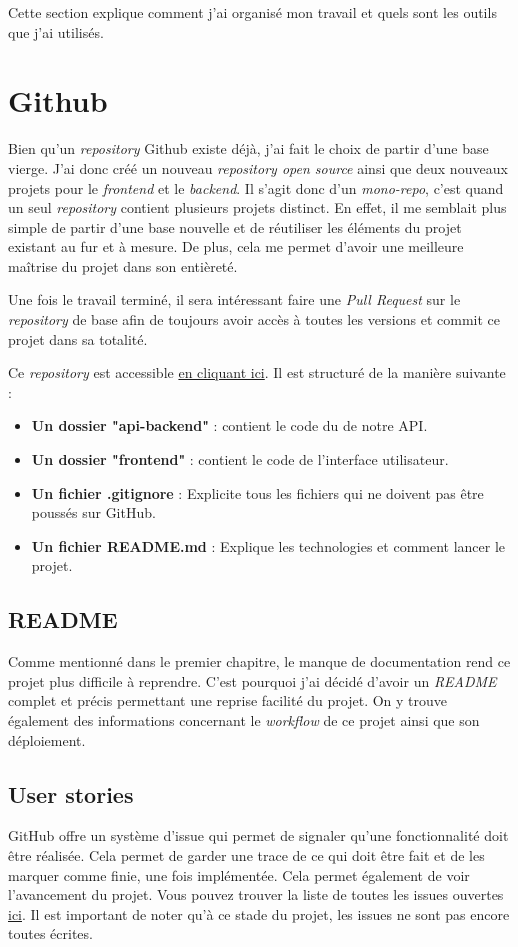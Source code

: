 Cette section explique comment j'ai organisé mon travail et quels sont les outils que j'ai utilisés.

\section{Github}
Bien qu'un \emph{repository} Github existe déjà, j'ai fait le choix de partir d'une base vierge. J'ai donc créé un nouveau \emph{repository open source} ainsi que deux nouveaux projets pour le \emph{frontend} et le \emph{backend}. Il s'agit donc d'un \emph{mono-repo}, c'est quand un seul \emph{repository} contient plusieurs projets distinct. En effet, il me semblait plus simple de partir d'une base nouvelle et de réutiliser les éléments du projet existant au fur et à mesure. De plus, cela me permet d'avoir une meilleure maîtrise du projet dans son entièreté.

Une fois le travail terminé, il sera intéressant faire une \emph{Pull Request} sur le \emph{repository} de base afin de toujours avoir accès à toutes les versions et commit ce projet dans sa totalité.

Ce \emph{repository} est accessible \href{https://github.com/Marinlestylo/h-quiz}{en cliquant ici}. Il est structuré de la manière suivante :
\begin{itemize}
    \item \textbf{Un dossier "api-backend"} : contient le code du de notre API.
    \item \textbf{Un dossier "frontend"} : contient le code de l'interface utilisateur.
    \item \textbf{Un fichier .gitignore} : Explicite tous les fichiers qui ne doivent pas être poussés sur GitHub.
    \item \textbf{Un fichier README.md} : Explique les technologies et comment lancer le projet.
\end{itemize}

\subsection{README}
Comme mentionné dans le premier chapitre, le manque de documentation rend ce projet plus difficile à reprendre. C'est pourquoi j'ai décidé d'avoir un \emph{README} complet et précis permettant une reprise facilité du projet. On y trouve également des informations concernant le \emph{workflow} de ce projet ainsi que son déploiement.

\subsection{User stories}
GitHub offre un système d'issue qui permet de signaler qu'une fonctionnalité doit être réalisée. Cela permet de garder une trace de ce qui doit être fait et de les marquer comme finie, une fois implémentée. Cela permet également de voir l'avancement du projet. Vous pouvez trouver la liste de toutes les issues ouvertes \href{https://github.com/Marinlestylo/h-quiz/issues}{ici}. Il est important de noter qu'à ce stade du projet, les issues ne sont pas encore toutes écrites.


